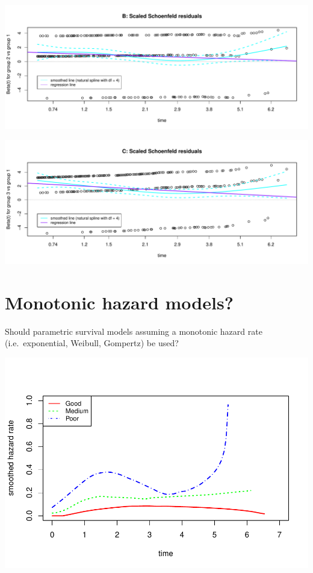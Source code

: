 \documentclass[]{article}
\begin{document}
\begin{flushleft}\includegraphics[height=0.29\textheight]{images/PH_assumption-2} \end{flushleft}

\begin{flushleft}\includegraphics[height=0.29\textheight]{images/PH_assumption-3} \end{flushleft}

\newpage

\section{Monotonic hazard models?}\label{monotonic-hazard-models}

Should parametric survival models assuming a monotonic hazard rate
(i.e.~exponential, Weibull, Gompertz) be used?

\begin{flushleft}\includegraphics{images/plot_hr-1} \end{flushleft}
\end{document}
